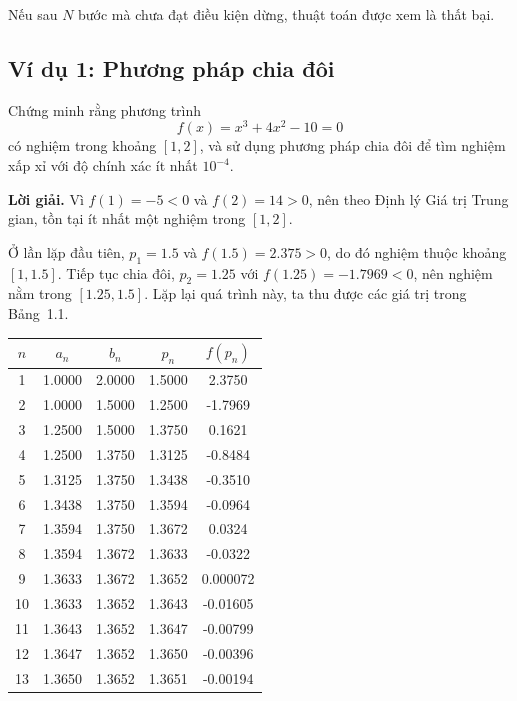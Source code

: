 Nếu sau $N$ bước mà chưa đạt điều kiện dừng, thuật toán được xem là thất bại.

\subsection*{\textbf{Ví dụ 1: Phương pháp chia đôi}}

Chứng minh rằng phương trình
\[
f(x) = x^3 + 4x^2 - 10 = 0
\]
có nghiệm trong khoảng $[1,2]$, và sử dụng phương pháp chia đôi để tìm nghiệm xấp xỉ với độ chính xác ít nhất $10^{-4}$.

\textbf{Lời giải.}  
Vì $f(1) = -5 < 0$ và $f(2) = 14 > 0$, nên theo Định lý Giá trị Trung gian, tồn tại ít nhất một nghiệm trong $[1,2]$.  

Ở lần lặp đầu tiên, $p_1 = 1.5$ và $f(1.5) = 2.375 > 0$, do đó nghiệm thuộc khoảng $[1,1.5]$.  
Tiếp tục chia đôi, $p_2 = 1.25$ với $f(1.25) = -1.7969 < 0$, nên nghiệm nằm trong $[1.25,1.5]$.  
Lặp lại quá trình này, ta thu được các giá trị trong Bảng~1.1.

\begin{center}
\begin{tabular}{|c|c|c|c|c|}
\hline
$n$ & $a_n$ & $b_n$ & $p_n$ & $f(p_n)$ \\
\hline
1  & 1.0000 & 2.0000 & 1.5000 & 2.3750 \\
2  & 1.0000 & 1.5000 & 1.2500 & -1.7969 \\
3  & 1.2500 & 1.5000 & 1.3750 & 0.1621 \\
4  & 1.2500 & 1.3750 & 1.3125 & -0.8484 \\
5  & 1.3125 & 1.3750 & 1.3438 & -0.3510 \\
6  & 1.3438 & 1.3750 & 1.3594 & -0.0964 \\
7  & 1.3594 & 1.3750 & 1.3672 & 0.0324 \\
8  & 1.3594 & 1.3672 & 1.3633 & -0.0322 \\
9  & 1.3633 & 1.3672 & 1.3652 & 0.000072 \\
10 & 1.3633 & 1.3652 & 1.3643 & -0.01605 \\
11 & 1.3643 & 1.3652 & 1.3647 & -0.00799 \\
12 & 1.3647 & 1.3652 & 1.3650 & -0.00396 \\
13 & 1.3650 & 1.3652 & 1.3651 & -0.00194 \\
\hline
\end{tabular}
\end{center}

